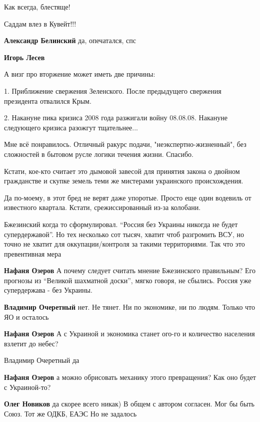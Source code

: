 \begin{itemize}
\begin{itemize}
\end{itemize} %

Как всегда, блестяще!

Саддам влез в Кувейт!!!

\begin{itemize} %
\textbf{Александр Белинский} да, опечатался, спс

\textbf{Игорь Лесев} 

А визг про вторжение может иметь две причины:

1. Приближение свержения Зеленского. После предыдущего свержения президента
отвалился Крым.

2. Накануне пика кризиса 2008 года разжигали войну 08.08.08. Накануне
следующего кризиса разожгут тщательнее...

\end{itemize} %


Мне всё понравилось. Отличный ракурс подачи, "неэкспертно-жизненный", без
сложностей в бытовом русле логики течения жизни. Спасибо.



Кстати, кое-кто считает это дымовой завесой для принятия закона о двойном
гражданстве и скупке земель теми же мистерами украинского происхождения.



Да по-моему, в этот бред не верят даже упоротые. Просто еще один водевиль от
известного квартала. Кстати, срежиссированный из-за колобани.


Бжезинский когда то сформулировал. \enquote{Россия без Украины никогда не будет супердержавой}.
Но тех несколько сот тысяч, хватит чтоб разгромить ВСУ, но точно не хватит для оккупации/контроля за такими территориями.
Так что это превентивная мера

\begin{itemize} %
\textbf{Нафаня Озеров} А почему следует считать мнение Бжезинского правильным? Его прогнозы из \enquote{Великой шахматной доски}, мягко говоря, не сбылись. Россия уже супердержава - без Украины.

\textbf{Владимир Очеретный} нет. Не тянет. Ни по экономике, ни по людям. Только что ЯО и осталось

\textbf{Нафаня Озеров} А с Украиной и экономика станет ого-го и количество населения взлетит до небес?

Владимир Очеретный да

\textbf{Нафаня Озеров} а можно обрисовать механику этого превращения? Как оно будет с Украиной-то?

\textbf{Олег Новиков} да скорее всего никак)
В общем с автором согласен.
Мог бы быть Союз. Тот же ОДКБ, ЕАЭС
Но не задалось

\end{itemize} %




\end{itemize} %
